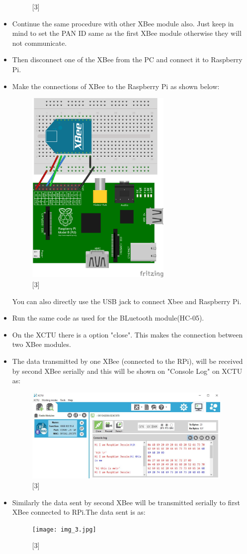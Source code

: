 \documentclass[11pt,a4paper]{article}
\begin{document}
\begin{itemize}
\begin{figure}[h!]
			\centering
			\caption{[3]}
		\end{figure}  
		\newpage
		\item Continue the same procedure with other XBee module also. Just keep in mind to set the PAN ID same as the first XBee module otherwise they will not communicate.
		\item Then disconnect one of the XBee from the PC and connect it to Raspberry Pi.
	\item 
	Make the connections of XBee to the Raspberry Pi as shown below:
	\begin{figure}[h!]
		\includegraphics[width=7cm]{rasp_pi_to_xbee.jpg}
		\centering
		\caption{[3]}
	\end{figure} 
	\newpage
	 You can also directly use the USB jack to connect Xbee and Raspberry Pi.
	\item Run the same code as used for the BLuetooth module(HC-05).
	\item On the XCTU there is a option "close". This makes the connection between two XBee modules.
	\item The data transmitted by one XBee (connected to the RPi), will be received by second XBee serially and this will be shown on "Console Log" on XCTU as:
	\begin{figure}[h!]
		\includegraphics[width=10cm]{Capture6.jpg}
		\centering
		\caption{[3]}
	\end{figure} 
	\newpage 
	\item Similarly the data sent by second XBee will be transmitted serially to first XBee connected to RPi.The data sent is as:
	\begin{figure}[h!]
		\texttt{[image: img\_3.jpg]}
		\centering
		\caption{[3]}
	\end{figure} 
	\end{itemize}
\end{document}
